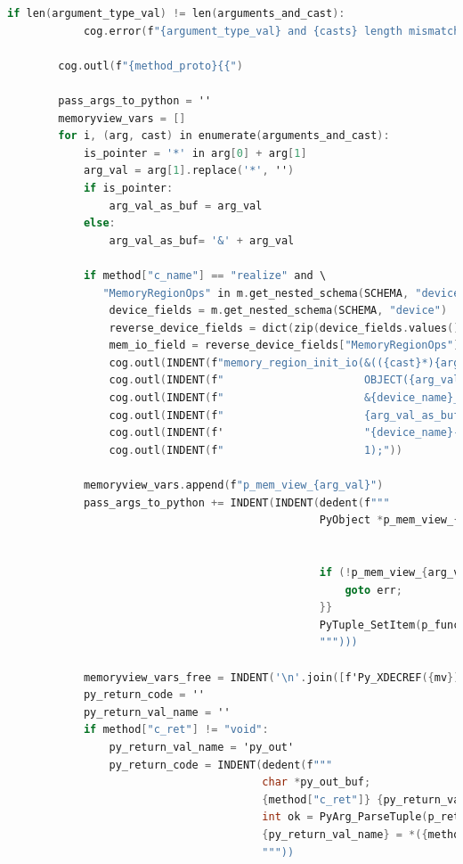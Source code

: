 \begin{lstlisting}[language={C},basicstyle=\tiny,stepnumber=1,caption={Шаблон устройства},label={lst:core.template.c}]
        if len(argument_type_val) != len(arguments_and_cast):
            cog.error(f"{argument_type_val} and {casts} length mismatch!")

        cog.outl(f"{method_proto}{{")

        pass_args_to_python = ''
        memoryview_vars = []
        for i, (arg, cast) in enumerate(arguments_and_cast):
            is_pointer = '*' in arg[0] + arg[1]
            arg_val = arg[1].replace('*', '')
            if is_pointer:
                arg_val_as_buf = arg_val
            else:
                arg_val_as_buf= '&' + arg_val

            if method["c_name"] == "realize" and \
               "MemoryRegionOps" in m.get_nested_schema(SCHEMA, "device").values():
                device_fields = m.get_nested_schema(SCHEMA, "device")
                reverse_device_fields = dict(zip(device_fields.values(), device_fields.keys()))
                mem_io_field = reverse_device_fields["MemoryRegionOps"]
                cog.outl(INDENT(f"memory_region_init_io(&(({cast}*){arg_val_as_buf})->{mem_io_field},"))
                cog.outl(INDENT(f"                      OBJECT({arg_val_as_buf}),"))
                cog.outl(INDENT(f"                      &{device_name}_mem_ops,"))
                cog.outl(INDENT(f"                      {arg_val_as_buf},"))
                cog.outl(INDENT(f'                      "{device_name}-mmio",'))
                cog.outl(INDENT(f"                      1);"))

            memoryview_vars.append(f"p_mem_view_{arg_val}")
            pass_args_to_python += INDENT(INDENT(dedent(f"""
                                                 PyObject *p_mem_view_{arg_val} = PyMemoryView_FromMemory((char*){arg_val_as_buf},
                                                                                                 {ALIGN_INDENT_BY(arg_val)}sizeof({cast}),
                                                                                                 {ALIGN_INDENT_BY(arg_val)}PyBUF_WRITE);
                                                 if (!p_mem_view_{arg_val}){{
                                                     goto err;
                                                 }}
                                                 PyTuple_SetItem(p_func_args, {i}, p_mem_view_{arg_val});
                                                 """)))

            memoryview_vars_free = INDENT('\n'.join([f'Py_XDECREF({mv});' for mv in memoryview_vars]))
            py_return_code = ''
            py_return_val_name = ''
            if method["c_ret"] != "void":
                py_return_val_name = 'py_out'
                py_return_code = INDENT(dedent(f"""
                                        char *py_out_buf;
                                        {method["c_ret"]} {py_return_val_name};
                                        int ok = PyArg_ParseTuple(p_ret, "S", &py_out_buf);
                                        {py_return_val_name} = *({method["c_ret"]}*)py_out_buf;
                                        """))


\end{lstlisting}
